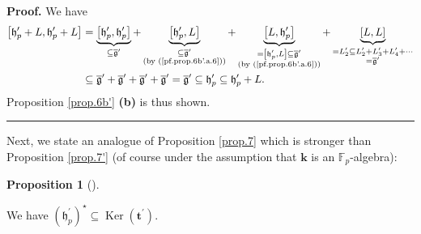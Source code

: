 \documentclass[numbers=enddot,12pt,final,onecolumn,notitlepage]{scrartcl}%
\theoremstyle{definition}
\newtheorem{prop}[theo]{Proposition}
\newenvironment{proposition}[1][]
{\begin{prop}[#1]\begin{leftbar}}
{\end{leftbar}\end{prop}}
\newenvironment{proof}[1][Proof]{\noindent\textbf{#1.} }{\ \rule{0.5em}{0.5em}}
\begin{document}
\begin{proof}
We have%
\begin{align*}
\left[  \mathfrak{h}_{p}^{\prime}+L,\mathfrak{h}_{p}^{\prime}+L\right]   &
=\underbrace{\left[  \mathfrak{h}_{p}^{\prime},\mathfrak{h}_{p}^{\prime
}\right]  }_{\subseteq\overline{\mathfrak{g}}^{\prime}}+\underbrace{\left[
\mathfrak{h}_{p}^{\prime},L\right]  }_{\substack{\subseteq\overline
{\mathfrak{g}}^{\prime}\\\text{(by (\ref{pf.prop.6b'.a.6}))}}%
}+\underbrace{\left[  L,\mathfrak{h}_{p}^{\prime}\right]  }%
_{\substack{=\left[  \mathfrak{h}_{p}^{\prime},L\right]  \subseteq
\overline{\mathfrak{g}}^{\prime}\\\text{(by (\ref{pf.prop.6b'.a.6}))}%
}}+\underbrace{\left[  L,L\right]  }_{\substack{=L_{2}^{\prime}\subseteq
L_{2}^{\prime}+L_{3}^{\prime}+L_{4}^{\prime}+\cdots\\=\overline{\mathfrak{g}%
}^{\prime}}}\\
&  \subseteq\overline{\mathfrak{g}}^{\prime}+\overline{\mathfrak{g}}^{\prime
}+\overline{\mathfrak{g}}^{\prime}+\overline{\mathfrak{g}}^{\prime}%
=\overline{\mathfrak{g}}^{\prime}\subseteq\mathfrak{h}_{p}^{\prime}%
\subseteq\mathfrak{h}_{p}^{\prime}+L.
\end{align*}
Proposition \ref{prop.6b'} \textbf{(b)} is thus shown.
\end{proof}

Next, we state an analogue of Proposition \ref{prop.7} which is stronger than
Proposition \ref{prop.7'} (of course under the assumption that $\mathbf{k}$ is
an $\mathbb{F}_{p}$-algebra):

\begin{proposition}
\label{prop.7''}We have $\left(  \mathfrak{h}_{p}^{\prime}\right)  ^{\star
}\subseteq\operatorname*{Ker}\left(  \mathbf{t}^{\prime}\right)  $.
\end{proposition}
\end{document}
